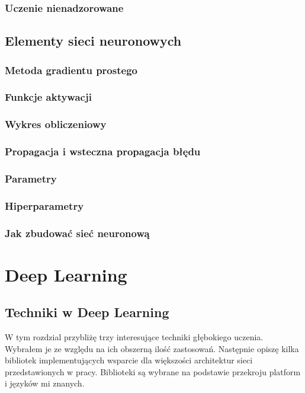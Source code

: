 \documentclass[a4paper,twoside,titlepage,openright]{book}
\begin{document}
\subsection*{Uczenie nienadzorowane}

\section{Elementy sieci neuronowych}
\subsection{Metoda gradientu prostego}
\subsection{Funkcje aktywacji}
\subsection{Wykres obliczeniowy}
\subsection{Propagacja i wsteczna propagacja błędu}
\subsection{Parametry}
\subsection{Hiperparametry}
\subsection{Jak zbudować sieć neuronową}

\chapter{Deep Learning}

\section{Techniki w Deep Learning}
W tym rozdzial przybliżę trzy interesujące techniki głębokiego uczenia. Wybrałem je ze względu na ich obszerną ilość zastosowań. Następnie opiszę kilka bibliotek implementujących wsparcie dla większości architektur sieci przedstawionych w pracy. Biblioteki są wybrane na podstawie przekroju platform i języków mi znanych. 
\end{document}
